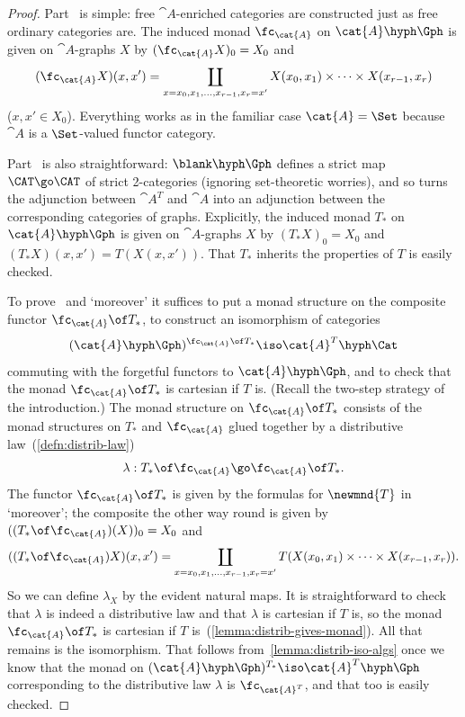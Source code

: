 \begin{proof}
Part~ is simple: free $\cat{A}$-enriched
categories are constructed just as free ordinary categories are.
The induced monad $\fc_\cat{A}$ on $\cat{A}\hyph\Gph$ is given on
$\cat{A}$-graphs $X$ by $(\fc_\cat{A} X)_0 = X_0$ and
\[
(\fc_\cat{A}X)(x,x')
=
\coprod_{x=x_0, x_1, \ldots, x_{r-1}, x_r=x'}
X(x_0, x_1) \times\cdots\times X(x_{r-1},x_r)
\]
($x,x' \in X_0$).  Everything works as in the familiar case $\cat{A}=\Set$
because $\cat{A}$ is a $\Set$-valued functor category.

Part~ is also straightforward: $\blank\hyph\Gph$
defines a strict map $\CAT \go \CAT$ of strict 2-categories (ignoring
set-theoretic worries), and so turns the adjunction between $\cat{A}^T$ and
$\cat{A}$ into an adjunction between the corresponding categories of
graphs.  Explicitly, the induced monad $T_*$ on $\cat{A}\hyph\Gph$ is given
on $\cat{A}$-graphs $X$ by $(T_* X)_0 = X_0$ and $(T_* X)(x,x') =
T(X(x,x'))$.  That $T_*$ inherits the properties of $T$ is easily checked.

To prove~ and `moreover' it suffices to put a
monad structure on the composite functor $\fc_\cat{A} \of T_*$, to
construct an isomorphism of categories
\[
(\cat{A}\hyph\Gph)^{\fc_\cat{A} \of T_*} \iso \cat{A}^T\hyph\Cat
\]
commuting with the forgetful functors to $\cat{A}\hyph\Gph$, and to check
that the monad $\fc_\cat{A} \of T_*$ is cartesian if $T$ is.  (Recall the
two-step strategy of the introduction.)  The monad structure on
$\fc_\cat{A} \of T_*$ consists of the monad structures on $T_*$ and
$\fc_\cat{A}$ glued together by a distributive%
%
%
law~(\ref{defn:distrib-law})
\[
\lambda: T_* \of \fc_\cat{A} \go \fc_\cat{A} \of T_*.
\]
The functor $\fc_\cat{A} \of T_*$ is given by the formulas for $\newmnd{T}$
in `moreover'; the composite the other way round is given by $((T_* \of
\fc_\cat{A})(X))_0 = X_0$ and
\[
((T_* \of \fc_\cat{A})X)(x,x') 
=
\coprod_{x=x_0, x_1, \ldots, x_{r-1}, x_r=x'}
T(X(x_0, x_1) \times\cdots\times X(x_{r-1},x_r)).
\]
So we can define $\lambda_X$ by the evident natural maps.  It is
straightforward to check that $\lambda$ is indeed a distributive law and
that $\lambda$ is cartesian if $T$ is, so the monad $\fc_\cat{A} \of T_*$
is cartesian if $T$ is~(\ref{lemma:distrib-gives-monad}).  All that remains
is the isomorphism.  That follows from~\ref{lemma:distrib-iso-algs} once we
know that the monad on $(\cat{A}\hyph\Gph)^{T_*} \iso \cat{A}^T\hyph\Gph$
corresponding to the distributive law $\lambda$ is $\fc_{\cat{A}^T}$, and
that too is easily checked.  \done
\end{proof}%
%
%
%
%





